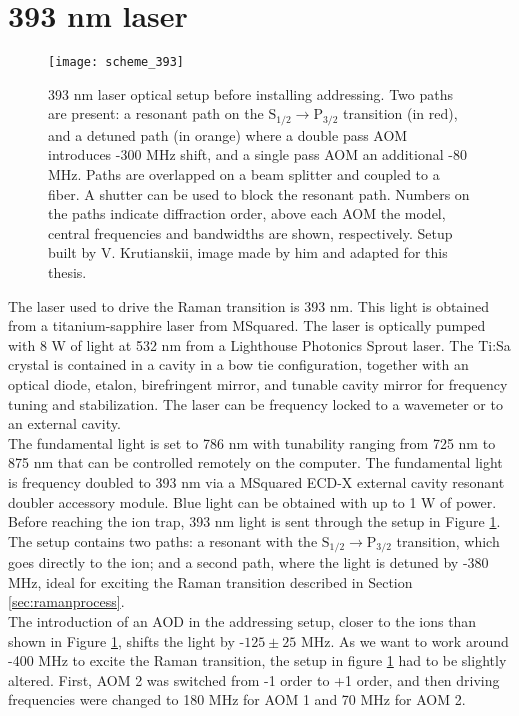 \section{393 nm laser}
\label{sec:393setup}
\begin{figure}[!ht]
\centering
\texttt{[image: scheme\_393]}
\caption{393 nm laser optical setup before installing addressing. Two paths are present: a resonant path on the $\text{S}_{1/2} \to \text{P}_{3/2}$ transition (in red), and a detuned path (in orange) where a double pass AOM introduces -300 MHz shift, and a single pass AOM an additional -80 MHz. Paths are overlapped on a beam splitter and coupled to a fiber. A shutter can be used to block the resonant path. Numbers on the paths indicate diffraction order, above each AOM the model, central frequencies and bandwidths are shown, respectively. Setup built by V. Krutianskii, image made by him and adapted for this thesis.
}
\label{scheme393}
\end{figure}
The laser used to drive the Raman transition is 393 nm. This light is obtained from a titanium-sapphire laser from MSquared. The laser is optically pumped with 8 W of light at 532 nm from a Lighthouse Photonics Sprout laser. The Ti:Sa crystal is contained in a cavity in a bow tie configuration, together with an optical diode, etalon, birefringent mirror, and tunable cavity mirror for frequency tuning and stabilization. The laser can be frequency locked to a wavemeter or to an external cavity.\\ The fundamental light is set to 786 nm with tunability ranging from 725 nm to 875 nm that can be controlled remotely on the computer. The fundamental light is frequency doubled to 393 nm via a MSquared ECD-X external cavity resonant doubler accessory module. Blue light can be obtained with up to 1 W of power. Before reaching the ion trap, 393 nm light is sent through the setup in Figure \ref{scheme393}. The setup contains two paths: a resonant with the $\text{S}_{1/2} \to \text{P}_{3/2}$ transition, which goes directly to the ion; and a second path, where the light is detuned by -380 MHz, ideal for exciting the Raman transition described in Section \ref{sec:ramanprocess}.\\
The introduction of an AOD in the addressing setup, closer to the ions than shown in Figure \ref{scheme393}, shifts the light by -$125\pm25$ MHz. As we want to work around -400 MHz to excite the Raman transition, the setup in figure \ref{scheme393} had to be slightly altered. First, AOM 2 was switched from -1 order to +1 order, and then driving frequencies were changed to 180 MHz for AOM 1 and 70 MHz for AOM 2.

